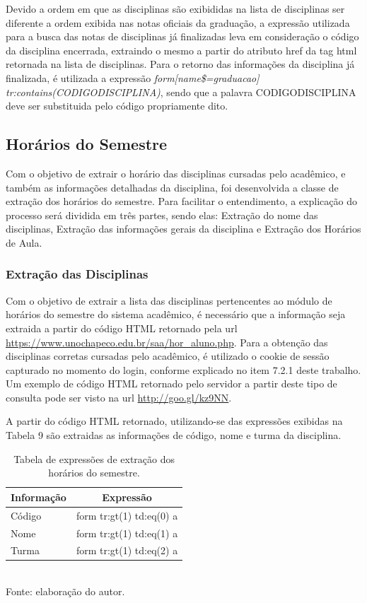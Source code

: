 Devido a ordem em que as disciplinas são exibididas na lista de disciplinas ser diferente a ordem exibida nas notas oficiais da graduação, a expressão utilizada para a busca das notas de disciplinas já finalizadas leva em consideração o código da disciplina encerrada, extraindo o mesmo a partir do atributo href da tag html retornada na lista de disciplinas. Para o retorno das informações da disciplina já finalizada, é utilizada a expressão \emph{form[name\$=graduacao] tr:contains(CODIGODISCIPLINA)}, sendo que a palavra CODIGODISCIPLINA deve ser substituida pelo código propriamente dito.

\subsection{Horários do Semestre}
Com o objetivo de extrair o horário das disciplinas cursadas pelo acadêmico, e também as informações detalhadas da disciplina, foi desenvolvida a classe de extração dos horários do semestre. Para facilitar o entendimento, a explicação do processo será dividida em três partes, sendo elas: Extração do nome das disciplinas, Extração das informações gerais da disciplina e Extração dos Horários de Aula.

\subsubsection{Extração das Disciplinas}
Com o objetivo de extrair a lista das disciplinas pertencentes ao módulo de horários do semestre do sistema acadêmico, é necessário que a informação seja extraida a partir do código HTML retornado pela url \url{https://www.unochapeco.edu.br/saa/hor_aluno.php}. Para a obtenção das disciplinas corretas cursadas pelo acadêmico, é utilizado o cookie de sessão capturado no momento do login, conforme explicado no item 7.2.1 deste trabalho. Um exemplo de código HTML retornado pelo servidor a partir deste tipo de consulta pode ser visto na url \url{http://goo.gl/kz9NN}.

A partir do código HTML retornado, utilizando-se das expressões exibidas na Tabela 9 são extraidas as informações de código, nome e turma da disciplina.

\begin{table}[!hbt]
\centering
\caption[Extração de Informações - Expressões de Extração Horários do Semestre]{Tabela de expressões de extração dos horários do semestre.}
\vspace{3mm}
\begin{tabular}{p{3cm}|c}\hline
\bf{Informação} & \bf{Expressão}           \\ \hline
Código          & form tr:gt(1) td:eq(0) a \\ \hline
Nome            & form tr:gt(1) td:eq(1) a \\ \hline
Turma           & form tr:gt(1) td:eq(2) a \\ \hline
\end{tabular}
\\ Fonte: elaboração do autor.
\end{table}

